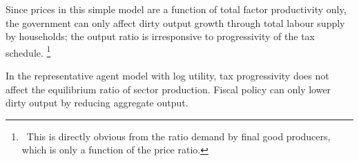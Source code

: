 Since prices in this simple model are a function of total factor productivity only, the government can only affect dirty output growth through total labour supply by households; the output ratio is irresponsive to progressivity of the tax schedule.%
\footnote{\ This is directly obvious from the ratio demand by final good producers, which is only a function of the price ratio. }


	\begin{comment}
	To see this write:
\begin{align}
	\frac{d\left(\frac{Y_d}{Y_c}\right)}{d \tau_l}=\frac{Y_d}{Y_c}\left(\frac{\frac{dY_d}{Y_d}}{d \tau_l}-\frac{\frac{dY_c}{Y_c}}{d \tau_l}\right)=0
\end{align}
and observe that the percentage change in sector output is homogeneous. 
\begin{align}
	\frac{1}{Y_d}\frac{dY_d}{d \tau_l}= \frac{1}{L_d}\frac{d L_d}{d \tau_l}=\frac{1}{H}\frac{d H}{d \tau_l}\ \text{and} \ \frac{1}{Y_c}\frac{dY_c}{d \tau_l}= \frac{1}{L_c}\frac{d L_c}{d \tau_l}=\frac{1}{H}\frac{d H}{d \tau_l}.
\end{align}
\textbf{}
content...
\end{comment}

\begin{prop}
	In the representative agent model with log utility, tax progressivity does not affect the equilibrium ratio of sector production. Fiscal policy can only lower dirty output by reducing aggregate output.
\end{prop}

